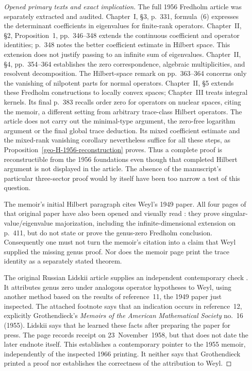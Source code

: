 \begin{proof}[Opened primary texts and exact implication]
The full 1956 Fredholm article was separately extracted and audited.
Chapter~I, \S3, p.~331, formula~(6) expresses the determinant coefficients
in eigenvalues for finite-rank operators. Chapter~II, \S2,
Proposition~1, pp.~346--348 extends the continuous coefficient and
operator identities; p.~348 notes the better coefficient estimate in
Hilbert space. This extension does not justify passing to an infinite
sum of eigenvalues. Chapter~II, \S4, pp.~354--364 establishes the
zero correspondence, algebraic multiplicities, and resolvent
decomposition. The Hilbert-space remark on pp.~363--364 concerns only
the vanishing of nilpotent parts for normal operators. Chapter~II,
\S5 extends these Fredholm constructions to locally convex spaces;
Chapter~III treats integral kernels. Its final p.~383 recalls order
zero for operators on nuclear spaces, citing the memoir, a different
setting from arbitrary trace-class Hilbert operators. The article does
not carry out the minimal-type argument, the zero-free logarithm argument
or the final global trace deduction. Its mixed coefficient estimate and
the mixed-rank vanishing corollary nevertheless suffice for all these
steps, as Proposition~\ref{geo-H-1956-reconstruction} proves. Thus a
complete proof is reconstructible from the 1956 foundations even though
that completed Hilbert argument is not displayed in the article. The
absence of the manuscript's particular three-sector proof would by itself
have been too narrow a test of this question.

The memoir's initial Hilbert paragraph cites Weyl's 1949 paper.
All four pages of that original paper
have also been opened and visually read \cite{Weyl1949}: they prove
singular-value/eigenvalue majorization, including the infinite-dimensional
extension on p.~411, but do not state or prove the genus-zero Fredholm
conclusion. Consequently one must not turn the memoir's citation into a
claim that Weyl supplied the missing genus proof. Nor does the memoir page
print the trace identity as a separately stated theorem.

The original Russian Lidskii article supplies an independent contemporary
check \cite[p.~487, final discussion, footnote and references 11--12]{algLidskii1959}.
It attributes genus zero under analogous operator hypotheses to Weyl,
using another method based on the results of reference~11, the 1949
paper just inspected. The attached footnote says that an indication
occurs in reference~12, explicitly Grothendieck's \emph{Memoirs of the
American Mathematical Society} no.~16 (1955). Lidskii says that he learned
these facts after preparing the paper for press. The page records receipt
on 23~November~1958, but that does not date the later endnote itself.
This establishes a contemporary pointer to the 1955 memoir, independently
of the inspected 1966 printing. It neither says that Grothendieck printed
a proof nor establishes the correctness of the attribution to Weyl.


\end{proof}
